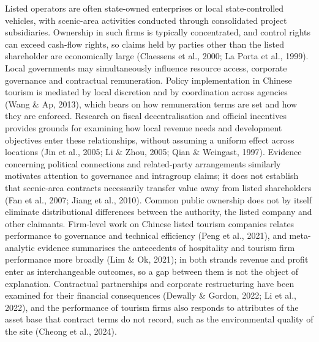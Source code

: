 \documentclass[review,3p,times]{elsarticle}
\begin{document}
Listed operators are often state-owned enterprises or local state-controlled vehicles, with scenic-area activities conducted through consolidated project subsidiaries. Ownership in such firms is typically concentrated, and control rights can exceed cash-flow rights, so claims held by parties other than the listed shareholder are economically large (Claessens et al., 2000; La Porta et al., 1999). Local governments may simultaneously influence resource access, corporate governance and contractual remuneration. Policy implementation in Chinese tourism is mediated by local discretion and by coordination across agencies (Wang \& Ap, 2013), which bears on how remuneration terms are set and how they are enforced. Research on fiscal decentralisation and official incentives provides grounds for examining how local revenue needs and development objectives enter these relationships, without assuming a uniform effect across locations (Jin et al., 2005; Li \& Zhou, 2005; Qian \& Weingast, 1997). Evidence concerning political connections and related-party arrangements similarly motivates attention to governance and intragroup claims; it does not establish that scenic-area contracts necessarily transfer value away from listed shareholders (Fan et al., 2007; Jiang et al., 2010). Common public ownership does not by itself eliminate distributional differences between the authority, the listed company and other claimants. Firm-level work on Chinese listed tourism companies relates performance to governance and technical efficiency (Peng et al., 2021), and meta-analytic evidence summarises the antecedents of hospitality and tourism firm performance more broadly (Lim \& Ok, 2021); in both strands revenue and profit enter as interchangeable outcomes, so a gap between them is not the object of explanation. Contractual partnerships and corporate restructuring have been examined for their financial consequences (Dewally \& Gordon, 2022; Li et al., 2022), and the performance of tourism firms also responds to attributes of the asset base that contract terms do not record, such as the environmental quality of the site (Cheong et al., 2024).
\end{document}
